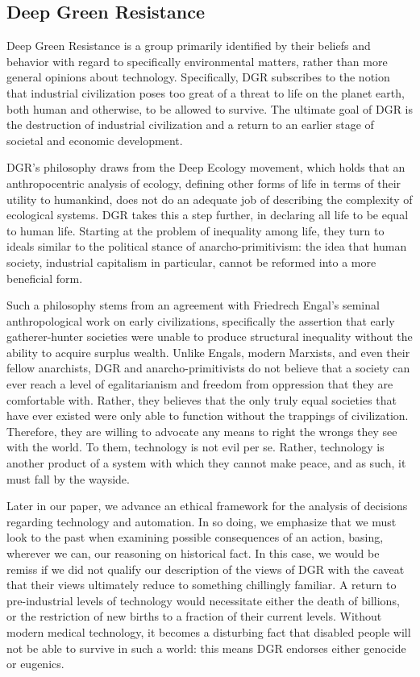 \subsection{Deep Green Resistance}
\label{sec:-dgr}
Deep Green Resistance is a group primarily identified by their beliefs 
and behavior with regard to specifically environmental matters, rather 
than more general opinions about technology.  Specifically, DGR subscribes 
to the notion that industrial civilization poses too great of a threat 
to life on the planet earth, both human and otherwise, to be allowed to 
survive.  The ultimate goal of DGR is the destruction of industrial 
civilization and a return to an earlier stage of societal and economic 
development.  

DGR's philosophy draws from the Deep Ecology movement, 
which holds that an anthropocentric analysis of ecology, defining other 
forms of life in terms of their utility to humankind, does not do an 
adequate job of describing the complexity of ecological systems.  DGR 
takes this a step further, in declaring all life to be equal to human 
life.  Starting at the problem of inequality among life, they turn to 
ideals similar to the political stance of anarcho-primitivism: the idea 
that human society, industrial capitalism in particular, cannot be 
reformed into a more beneficial form.  

Such a philosophy stems from 
an agreement with Friedrech Engal's seminal anthropological work on 
early civilizations\cite{engels2010origin}, specifically the assertion that 
early gatherer-hunter societies were unable to produce structural 
inequality without the ability to acquire surplus wealth.  Unlike Engals, 
modern Marxists, and even their fellow anarchists, DGR and 
anarcho-primitivists do not believe that a society can ever reach a level 
of egalitarianism and freedom from oppression that they are comfortable 
with.  Rather, they believes that the only truly equal societies that have 
ever existed were only able to function without the trappings of 
civilization.  Therefore, they are willing to advocate any means to right 
the wrongs they see with the world.  To them, technology is not evil 
per se.  Rather, technology is another product of a system with which 
they cannot make peace, and as such, it must fall by the wayside.

Later in our paper, we advance an ethical framework for the analysis of 
decisions regarding technology and automation.  In so doing, we 
emphasize that we must look to the past when examining possible 
consequences of an action, basing, wherever we can, our reasoning on 
historical fact.  In this case, we would be remiss if we did not qualify 
our description of the views of DGR with the caveat that their views 
ultimately reduce to something chillingly familiar.  A return to 
pre-industrial levels of technology would necessitate either the death 
of billions, or the restriction of new births to a fraction of their 
current levels.  Without modern medical technology, it becomes a 
disturbing fact that disabled people will not be able to survive in 
such a world: this means DGR endorses either genocide or eugenics.


